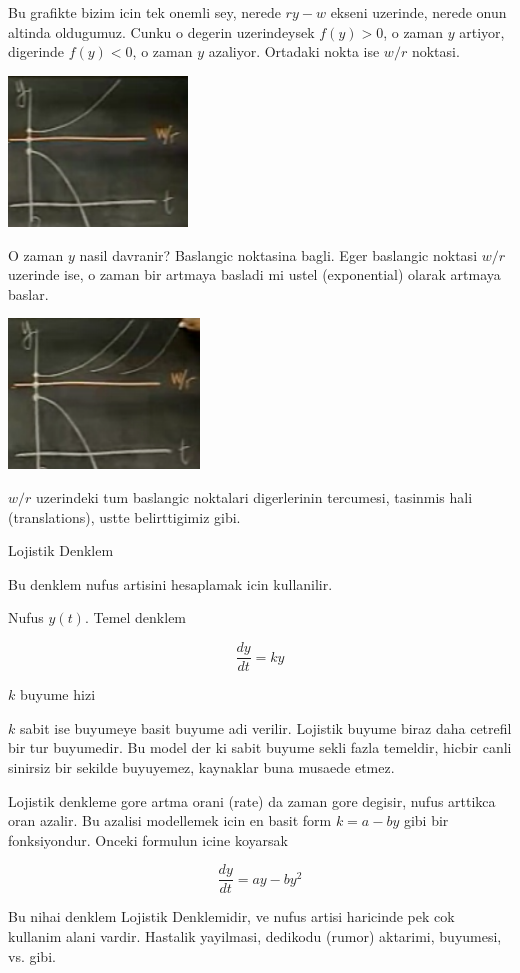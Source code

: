 \documentclass[12pt,fleqn]{article}
\begin{document}
Bu grafikte bizim icin tek onemli sey, nerede $ry-w$ ekseni uzerinde,
nerede onun altinda oldugumuz. Cunku o degerin uzerindeysek $f(y) > 0$, o
zaman $y$ artiyor, digerinde $f(y) < 0$, o zaman $y$ azaliyor. Ortadaki
nokta ise $w/r$ noktasi.

\includegraphics[height=4cm]{5_5.png}

O zaman $y$ nasil davranir? Baslangic noktasina bagli. Eger baslangic
noktasi $w/r$ uzerinde ise, o zaman bir artmaya basladi mi ustel
(exponential) olarak artmaya baslar.

\includegraphics[height=4cm]{5_6.png}

$w/r$ uzerindeki tum baslangic noktalari digerlerinin tercumesi, tasinmis
hali (translations), ustte belirttigimiz gibi. 

Lojistik Denklem

Bu denklem nufus artisini hesaplamak icin kullanilir. 

Nufus $y(t)$.  Temel denklem

\[ \frac{dy}{dt} = ky\]

$k$ buyume hizi

$k$ sabit ise buyumeye basit buyume adi verilir. Lojistik buyume biraz daha
cetrefil bir tur buyumedir. Bu model der ki sabit buyume sekli fazla
temeldir, hicbir canli sinirsiz bir sekilde buyuyemez, kaynaklar buna
musaede etmez. 

Lojistik denkleme gore artma orani (rate) da zaman gore degisir, nufus
arttikca oran azalir. Bu azalisi modellemek icin en basit form $k = a - by$
gibi bir fonksiyondur. Onceki formulun icine koyarsak

\[ \frac{dy}{dt} = ay - by^2 \]

Bu nihai denklem Lojistik Denklemidir, ve nufus artisi haricinde pek cok
kullanim alani vardir. Hastalik yayilmasi, dedikodu (rumor) aktarimi,
buyumesi, vs. gibi.
\end{document}
